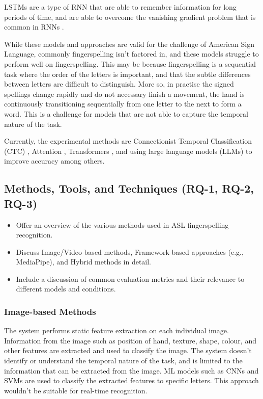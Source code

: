 LSTMs are a type of RNN that are able to remember information for long periods of time, and are able to overcome the vanishing gradient problem that is common in RNNs \cite{sherstinskyFundamentalsRecurrentNeural2020}.


While these models and approaches are valid for the challenge of American Sign Language, commonly fingerspelling isn't factored in, and these models struggle to perform well on fingerspelling. This may be because fingerspelling is a sequential task where the order of the letters is important, and that the subtle differences between letters are difficult to distinguish. More so, in practise the signed spellings change rapidly and do not necessary finish a movement, the hand is continuously transitioning sequentially from one letter to the next to form a word. This is a challenge for models that are not able to capture the temporal nature of the task.

Currently, the experimental methods are Connectionist Temporal Classification (CTC) \cite{gravesConnectionistTemporalClassification2006a, shiAmericanSignLanguage2018}, Attention \cite{bahdanauNeuralMachineTranslation2016}, Transformers \cite{vaswaniAttentionAllYou2023}, and using large language models (LLMs) to improve accuracy among others.

\begin{landscape}
    
\end{landscape}

\subsection{Methods, Tools, and Techniques (RQ-1, RQ-2, RQ-3)}

\begin{itemize}
    \item Offer an overview of the various methods used in ASL fingerspelling recognition.
    \item Discuss Image/Video-based methods, Framework-based approaches (e.g., MediaPipe), and Hybrid methods in detail.
    \item Include a discussion of common evaluation metrics and their relevance to different models and conditions.
\end{itemize}

\subsubsection{Image-based Methods} %
The system performs static feature extraction on each individual image. Information from the image such as position of hand, texture, shape, colour, and other features are extracted and used to classify the image. The system doesn't identify or understand the temporal nature of the task, and is limited to the information that can be extracted from the image. ML models such as CNNs and SVMs are used to classify the extracted features to specific letters. This approach wouldn't be suitable for real-time recognition.
